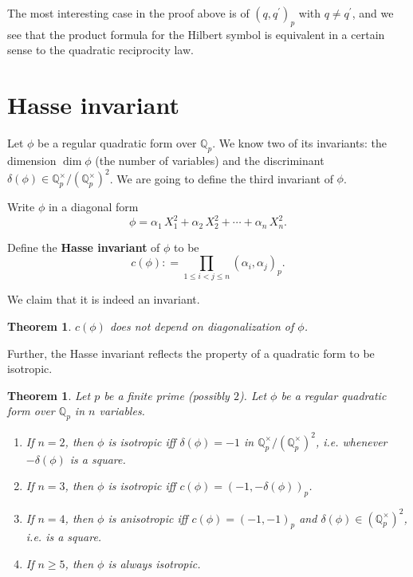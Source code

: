 \documentclass{article}
\newcommand{\term}{\textbf}
\newcommand{\dfn}{\mathrel{\mathop:}=}
\newcommand{\QQ}{\mathbb{Q}}
\theoremstyle{myplain}
\newtheorem{theorem}[proposition]{Theorem}
\theoremstyle{mydefinition}
\begin{document}
The most interesting case in the proof above is of $(q,q^\prime)_p$ with
$q \ne q^\prime$, and we see that the product formula for the Hilbert symbol is
equivalent in a certain sense to the quadratic reciprocity law.

\section{Hasse invariant}
\label{section:hasse-invariant}

Let $\phi$ be a regular quadratic form over $\QQ_p$. We know two of its
invariants: the dimension $\dim \phi$ (the number of variables) and the
discriminant $\delta (\phi) \in \QQ_p^\times / (\QQ_p^\times)^2$. We are going
to define the third invariant of $\phi$.

Write $\phi$ in a diagonal form
\[ \phi = \alpha_1\,X_1^2 + \alpha_2\,X_2^2 + \cdots + \alpha_n\,X_n^2. \]

Define the \term{Hasse invariant} of $\phi$ to be
\[ c(\phi) \dfn \prod_{1\le i < j \le n} (\alpha_i,\alpha_j)_p. \]

We claim that it is indeed an invariant.

\begin{theorem}\label{theorem:hasse-is-invariant}
  $c (\phi)$ does not depend on diagonalization of $\phi$.
\end{theorem}

Further, the Hasse invariant reflects the property of a quadratic form to be
isotropic.

\begin{theorem}\label{theorem:dimension-isotropic}
  Let $p$ be a finite prime (possibly $2$). Let $\phi$ be a regular quadratic
  form over $\QQ_p$ in $n$ variables.

  \begin{enumerate}
  \item If $n = 2$, then $\phi$ is isotropic iff $\delta (\phi) = -1$ in
    $\QQ_p^\times / (\QQ_p^\times)^2$, i.e. whenever $-\delta (\phi)$ is a
    square.

  \item If $n = 3$, then $\phi$ is isotropic iff
    $c (\phi) = (-1, -\delta (\phi))_p$.

  \item If $n = 4$, then $\phi$ is anisotropic iff $c (\phi) = (-1,-1)_p$ and
    $\delta (\phi) \in (\QQ_p^\times)^2$, i.e. is a square.

  \item If $n \ge 5$, then $\phi$ is always isotropic.
  \end{enumerate}
\end{theorem}
\end{document}
